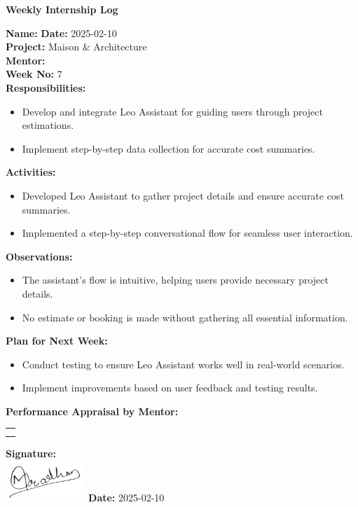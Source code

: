 \begin{center}
    \bfseries Weekly Internship Log
\end{center}

\noindent
\textbf{Name:}  \hfill \textbf{Date:} 2025-02-10 \\
\textbf{Project:} Maison \& Architecture \hfill \\
\textbf{Mentor:}  \\
\textbf{Week No:} 7 \\

\noindent
\textbf{Responsibilities:}
\begin{itemize}
    \item Develop and integrate Leo Assistant for guiding users through project estimations.
    \item Implement step-by-step data collection for accurate cost summaries.
\end{itemize}

\noindent
\textbf{Activities:}
\begin{itemize}
    \item Developed Leo Assistant to gather project details and ensure accurate cost summaries.
    \item Implemented a step-by-step conversational flow for seamless user interaction.
\end{itemize}

\noindent
\textbf{Observations:}
\begin{itemize}
    \item The assistant’s flow is intuitive, helping users provide necessary project details.
    \item No estimate or booking is made without gathering all essential information.
\end{itemize}

\noindent
\textbf{Plan for Next Week:}
\begin{itemize}
    \item Conduct testing to ensure Leo Assistant works well in real-world scenarios.
    \item Implement improvements based on user feedback and testing results.
\end{itemize}

\noindent
\textbf{Performance Appraisal by Mentor:} \\
\begin{table}[h]
    \centering
    \noindent
    \begin{tabularx}{\textwidth} { 
        | >{\centering\arraybackslash}X| }

        \hline
        \\ \\
        \hline
    \end{tabularx}
\end{table}

\vfill
\noindent
\textbf{Signature:} \\
\includegraphics[width=3cm]{assets/nirajpradhan-sign.png} \hfill \textbf{Date:} 2025-02-10
